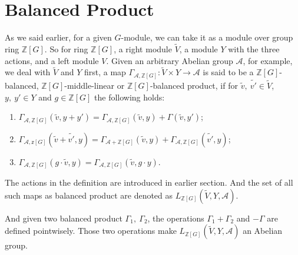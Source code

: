 \documentclass[12pt,a4paper,english]{article}
\theoremstyle{plain}
\theoremstyle{definition}
\begin{document}
\section{Balanced Product}\label{balanced}
As we said earlier, for a given $G$-module, we can take it as a module over group ring $\mathbb{Z}[G]$. So for ring $\mathbb{Z}[G]$, a  right module $\tilde{V}$, a module $Y$ with the three actions, and a left module $V$. Given an arbitrary Abelian group $\mathcal{A}$, for example, we deal with $\tilde{V}$ and $Y$ first, a map $\Gamma_{\mathcal{A},\mathbb{Z}[G]}: \tilde{V}\times Y\rightarrow \mathcal{A}$ is said to be a $\mathbb{Z}[G]$-balanced, $\mathbb{Z}[G]$-middle-linear or $\mathbb{Z}[G]$-balanced product, if for $\tilde{v},\ \tilde{v'}\in \tilde{V}$, $y,\ y'\in Y$ and $g\in \mathbb{Z}[G]$ the following holds:
\begin{enumerate}
    \item $\Gamma_{\mathcal{A},\mathbb{Z}[G]}(\tilde{v}, y+y')=\Gamma_{\mathcal{A},\mathbb{Z}[G]}(\tilde{v},y)+ \Gamma(\tilde{v},y')$;
    \item $\Gamma_{\mathcal{A},\mathbb{z}[G]}(\tilde{v}+\tilde{v'},y)=\Gamma_{\mathcal{A}+\mathbb{Z}[G]}(\tilde{v},y)+\Gamma_{\mathcal{A},\mathbb{Z}[G]}(\tilde{v'},y)$;
    \item $\Gamma_{\mathcal{A},\mathbb{Z}[G]}(g\cdot \tilde{v},y)=\Gamma_{\mathcal{A},\mathbb{Z}[G]}(\tilde{v},g\cdot y)$.
\end{enumerate}
The actions in the definition are introduced in earlier section. And
the set of all such maps as balanced product are denoted as $L_{\mathbb{Z}[G]}(\tilde{V},Y,\mathcal{A})$.

And given two balanced product $\Gamma_{1},\ \Gamma_{2}$, the operations $\Gamma_{1}+\Gamma_{2}$ and $-\Gamma$ are defined pointwisely. Those two operations make $L_{\mathbb{Z}[G]}(\tilde{V},Y,\mathcal{A})$ an Abelian group.
\newpage


\end{document}
